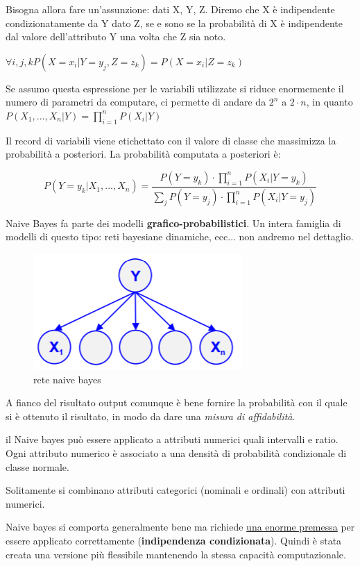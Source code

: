 Bisogna allora fare un'assunzione: dati X, Y, Z. Diremo che X \`e indipendente condizionatamente da Y dato Z, se e sono se la probabilit\`a di X è indipendente dal valore dell'attributo Y una volta che Z sia noto. 

$\forall i,j,k P(X=x_i|Y=y_j, Z=z_k) = P(X=x_i|Z=z_k)$

Se assumo questa espressione per le variabili utilizzate si riduce enormemente il numero di parametri da computare, ci permette di andare da $2^n$ a $2 \cdot n$, in quanto $P(X_1, ..., X_n|Y) = \prod_{i=1}^n P(X_i|Y)$

Il record di variabili viene etichettato con il valore di classe che massimizza la probabilit\`a a posteriori.
La probabilit\`a computata a posteriori \`e:

\[P(Y=y_k|X_1,...,X_n) = \frac{P(Y=y_k)\cdot \prod_{i=1}^{n}P(X_i|Y=y_k)}{\sum_{j}P(Y=y_j) \cdot \prod_{i=1}^{n}P(X_i|Y=y_j)} \]

Naive Bayes fa parte dei modelli \textbf{grafico-probabilistici}. Un intera famiglia di modelli di questo tipo: reti bayesiane dinamiche, ecc... non andremo nel dettaglio.

\begin{figure}[h!]
	\centering
	\includegraphics[height=0.3 \linewidth]{classification/pict/naivebayes.png}
	\caption{rete naive bayes}
\end{figure}

A fianco del risultato output comunque \`e bene fornire la probabilit\`a con il quale si \`e ottenuto il risultato, in modo da dare una \textit{misura di affidabilit\`a}. 

il Naive bayes pu\`o essere applicato a attributi numerici quali intervalli e ratio. Ogni attributo numerico è associato a una densit\`a di probabilit\`a condizionale di classe normale. 

Solitamente si combinano attributi categorici (nominali e ordinali) con attributi numerici. 

Naive bayes si comporta generalmente bene ma richiede \underline{una enorme premessa} per essere applicato correttamente (\textbf{indipendenza condizionata}). Quindi \`e stata creata una versione pi\`u flessibile mantenendo la stessa capacit\`a computazionale.

